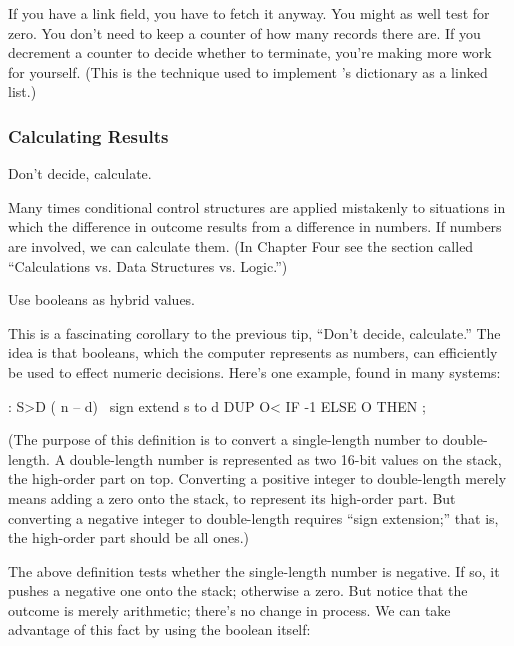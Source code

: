 If you have a link field, you have to fetch it anyway. You might as
well test for zero. You don't need to keep a counter of how many records
there are. If you decrement a counter to decide whether to terminate,
you're making more work for yourself. (This is the technique used to
implement \Forth{}'s dictionary as a linked list.)%
%
%

\subsubsection{Calculating Results}%
%

\begin{tip}
Don't decide, calculate.
\end{tip}
Many times conditional control structures are applied mistakenly to
situations in which the difference in outcome results from a difference in
numbers. If numbers are involved, we can calculate them. (In Chapter
Four see the section called ``Calculations vs. Data Structures vs. Logic.'')
%
\begin{tip}
Use booleans as hybrid values.
\end{tip}
This is a fascinating corollary to the previous tip, ``Don't decide,
calculate.'' The idea is that booleans, which the computer represents as
numbers, can efficiently be used to effect numeric decisions. Here's one
example, found in many \Forth{} systems:

\begin{Code}
: S>D  ( n -- d)  \ sign extend s to d
     DUP O<  IF -1  ELSE  O THEN ;
\end{Code}
(The purpose of this definition is to convert a single-length number to
double-length. A double-length number is represented as two 16-bit
values on the stack, the high-order part on top. Converting a positive
integer to double-length merely means adding a zero onto the stack, to
represent its high-order part. But converting a negative integer to
double-length requires ``sign extension;'' that is, the high-order part
should be all ones.)

The above definition tests whether the single-length number is
negative. If so, it pushes a negative one onto the stack; otherwise a zero.
But notice that the outcome is merely arithmetic; there's no change
in process. We can take advantage of this fact by using the boolean itself:

